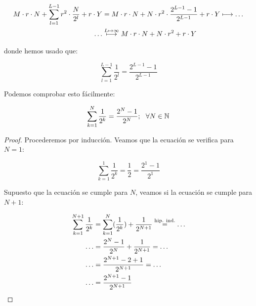\begin{equation}
	\begin{split}
		M \cdot r \cdot N + \sum_{l = 1}^{L-1} r^2 \cdot \frac{N}{2^l} + r \cdot Y &= M \cdot r \cdot N + N \cdot r^2 \cdot \frac{2^{L-1} - 1}{2^{L-1}} + r \cdot Y \longmapsto \ldots \\
		\ldots & \encima{\longmapsto}{L \mapsto \infty} M \cdot r \cdot N + N \cdot r^2 + r \cdot Y
	\end{split}
\end{equation}

donde hemos usado que:

\begin{equation}
	\sum_{l = 1}^{L-1} \frac{1}{2^l} = \frac{2^{L-1} - 1}{2^{L-1}}
\end{equation}

Podemos comprobar esto fácilmente:

\begin{proposicion}
	\begin{equation}
		\sum_{k = 1}^{N} \frac{1}{2^k} = \frac{2^N - 1}{2^N}; \dspace \forall N \in \N
	\end{equation}
\end{proposicion}

\begin{proof}
	Procederemos por inducción. Veamos que la ecuación se verifica para $N = 1$:

	\begin{equation}
		\sum_{k = 1}^{1} \frac{1}{2^k} = \frac{1}{2} = \frac{2^1 - 1}{2^1}
	\end{equation}

	Supuesto que la ecuación se cumple para $N$, veamos si la ecuación se cumple para $N + 1$:

	\begin{equation}
		\begin{split}
			\sum_{k = 1}^{N+1} \frac{1}{2^k} &= \sum_{k = 1}^{N} (\frac{1}{2^k}) + \frac{1}{2^{N+1}} \encima{=}{\text{hip. ind.}} \ldots \\
			\ldots &= \frac{2^N - 1}{2^N} + \frac{1}{2^{N+1}} = \ldots \\
			\ldots &= \frac{2^{N+1} - 2 + 1}{2^{N+1}} = \ldots \\
			\ldots &= \frac{2^{N+1} - 1}{2^{N+1}}
		\end{split}
	\end{equation}
\end{proof}

